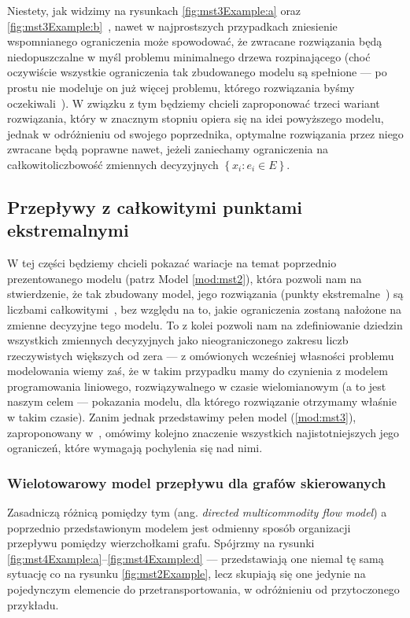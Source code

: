 Niestety, jak widzimy na rysunkach \ref{fig:mst3Example:a} oraz \ref{fig:mst3Example:b}~\cite[$41$]{Magnanti1995503}, nawet w najprostszych przypadkach zniesienie wspomnianego ograniczenia może spowodować, że zwracane rozwiązania będą niedopuszczalne w myśl problemu minimalnego drzewa rozpinającego (choć oczywiście wszystkie ograniczenia tak zbudowanego modelu są spełnione --- po prostu nie modeluje on już więcej problemu, którego rozwiązania byśmy oczekiwali~\cite[$39$]{Magnanti1995503}). W związku z tym będziemy chcieli zaproponować trzeci wariant rozwiązania, który w znacznym stopniu opiera się na idei powyższego modelu, jednak w odróżnieniu od swojego poprzednika, optymalne rozwiązania przez niego zwracane będą poprawne nawet, jeżeli zaniechamy ograniczenia na całkowitoliczbowość zmiennych decyzyjnych $\left\{ x_{i} : e_{i} \in E \right\}$.

\subsection{Przepływy z całkowitymi punktami ekstremalnymi}

W tej części będziemy chcieli pokazać wariacje na temat poprzednio prezentowanego modelu (patrz Model \ref{mod:mst2}), która pozwoli nam na stwierdzenie, że tak zbudowany model, jego rozwiązania (punkty ekstremalne~\cite{Papadimitriou:1982:COA:31027}) są liczbami całkowitymi~\cite[$42$--$46$]{Magnanti1995503}, bez względu na to, jakie ograniczenia zostaną nałożone na zmienne decyzyjne tego modelu. To z kolei pozwoli nam na zdefiniowanie dziedzin wszystkich zmiennych decyzyjnych jako nieograniczonego zakresu liczb rzeczywistych większych od zera --- z omówionych wcześniej własności problemu modelowania wiemy zaś, że w takim przypadku mamy do czynienia z modelem programowania liniowego, rozwiązywalnego w czasie wielomianowym (a to jest naszym celem --- pokazania modelu, dla którego rozwiązanie otrzymamy właśnie w takim czasie). Zanim jednak przedstawimy pełen model (\ref{mod:mst3}), zaproponowany w~\cite[$42$--$46$]{Magnanti1995503}, omówimy kolejno znaczenie wszystkich najistotniejszych jego ograniczeń, które wymagają pochylenia się nad nimi.

\subsubsection{Wielotowarowy model przepływu dla grafów skierowanych} 

Zasadniczą różnicą pomiędzy tym (ang. \textit{directed multicommodity flow model}) a poprzednio przedstawionym modelem jest odmienny sposób organizacji przepływu pomiędzy wierzchołkami grafu. Spójrzmy na rysunki \ref{fig:mst4Example:a}--\ref{fig:mst4Example:d} --- przedstawiają one niemal tę samą sytuację co na rysunku \ref{fig:mst2Example}, lecz skupiają się one jedynie na pojedynczym elemencie do przetransportowania, w odróżnieniu od przytoczonego przykładu.

